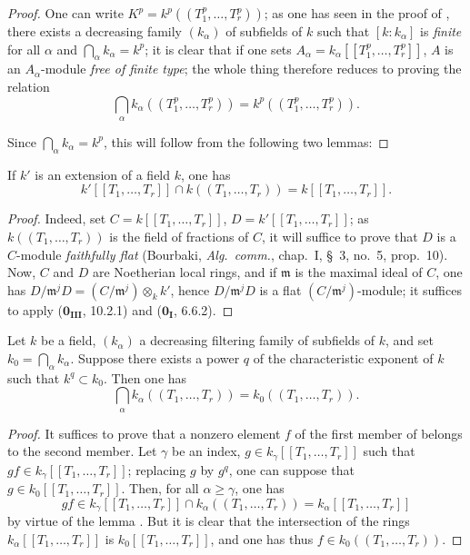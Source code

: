 \begin{proof}
One can write $K^p=k^p((T_1^p,\ldots,T_r^p))$; as one has seen in the proof of , there exists a decreasing family $(k_\alpha)$ of subfields of $k$ such that $[k:k_\alpha]$ is \emph{finite} for all $\alpha$ and $\bigcap_\alpha k_\alpha=k^p$; it is clear that if one sets $A_\alpha=k_\alpha[[T_1^p,\ldots,T_r^p]]$, $A$ is an $A_\alpha$-module \emph{free of finite type}; the whole thing therefore reduces to proving the relation
\begin{equation}
\tag{21.8.8.1}
  \label{0.21.8.8.1}
  \bigcap_\alpha k_\alpha((T_1^p,\ldots,T_r^p))=k^p((T_1^p,\ldots,T_r^p)).
\end{equation}

Since $\bigcap_\alpha k_\alpha=k^p$, this will follow from the following two lemmas:
\end{proof}

\begin{lemma}[21.8.8.2]
\label{0.21.8.8.2}
If $k'$ is an extension of a field $k$, one has
\[
  k'[[T_1,\ldots,T_r]]\cap k((T_1,\ldots,T_r))=k[[T_1,\ldots,T_r]].
\]
\end{lemma}

\begin{proof}
Indeed, set $C=k[[T_1,\ldots,T_r]]$, $D=k'[[T_1,\ldots,T_r]]$; as $k((T_1,\ldots,T_r))$ is the field of fractions of $C$, it will suffice to prove that $D$ is a $C$-module \emph{faithfully flat} (Bourbaki, \emph{Alg.\ comm.}, chap.~I, \S~3, no.~5, prop.~10).
Now, $C$ and $D$ are Noetherian local rings, and if $\mathfrak{m}$ is the maximal ideal of $C$, one has $D/\mathfrak{m}^j D=(C/\mathfrak{m}^j)\otimes_k k'$, hence $D/\mathfrak{m}^j D$ is a flat $(C/\mathfrak{m}^j)$-module; it suffices to apply ($\mathbf{0_{III}}$, 10.2.1) and ($\mathbf{0_I}$, 6.6.2).
\end{proof}

\begin{lemma}[21.8.8.3]
\label{0.21.8.8.3}
Let $k$ be a field, $(k_\alpha)$ a decreasing filtering family of subfields of $k$, and set $k_0=\bigcap_\alpha k_\alpha$.
Suppose there exists a power $q$ of the characteristic exponent of $k$ such that $k^q\subset k_0$.
Then one has
\begin{equation}
\tag{21.8.8.4}
  \label{0.21.8.8.4}
  \bigcap_\alpha k_\alpha((T_1,\ldots,T_r))=k_0((T_1,\ldots,T_r)).
\end{equation}
\end{lemma}

\begin{proof}
It suffices to prove that a nonzero element $f$ of the first member of  belongs to the second member.
Let $\gamma$ be an index, $g\in k_\gamma[[T_1,\ldots,T_r]]$ such that $gf\in k_\gamma[[T_1,\ldots,T_r]]$; replacing $g$ by $g^q$, one can suppose that $g\in k_0[[T_1,\ldots,T_r]]$.
Then, for all $\alpha\geqslant\gamma$, one has
\[
  gf\in k_\gamma[[T_1,\ldots,T_r]]\cap k_\alpha((T_1,\ldots,T_r))=k_\alpha[[T_1,\ldots,T_r]]
\]
by virtue of the lemma .
But it is clear that the intersection of the rings $k_\alpha[[T_1,\ldots,T_r]]$ is $k_0[[T_1,\ldots,T_r]]$, and one has thus $f\in k_0((T_1,\ldots,T_r))$.
\end{proof}


